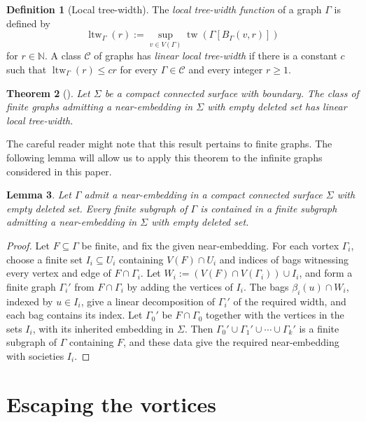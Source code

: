 \documentclass[10pt,a4paper]{amsart}
\newtheorem{theorem}{Theorem}[section]%
\newtheorem{lemma}[theorem]{Lemma}
\theoremstyle{definition}
\newtheorem{definition}[theorem]{Definition}
\begin{document}
\begin{definition}[Local tree-width]\label{def:local-tree-width}
The \emph{local tree-width function} of a graph $\Gamma$ is defined by 
$$
\operatorname{ltw}_\Gamma(r):=\sup_{v\in V(\Gamma)}\operatorname{tw}(\Gamma[B_\Gamma(v,r)])
$$
for $r\in\mathbb{N}$.
A class $\mathcal{C}$ of graphs has \emph{linear local tree-width} if there is a constant $c$ such that $\operatorname{ltw}_\Gamma(r)\leq cr$ for every $\Gamma\in\mathcal{C}$ and every integer $r\geq1$.
\end{definition}

\begin{theorem}[{\cite[Prop.~3.8]{Grohe03}}]\label{thm:grohe-local-tree-width}
Let $\Sigma$ be a compact connected surface with boundary.
The class of finite graphs admitting a near-embedding in $\Sigma$ with empty deleted set has linear local tree-width.
\end{theorem}

The careful reader might note that this result pertains to finite graphs.
The following lemma will allow us to apply this theorem to the infinite graphs considered in this paper.

\begin{lemma}\label{lem:finite-near-embedded-subgraph}
Let $\Gamma$ admit a near-embedding in a compact connected surface $\Sigma$ with empty deleted set.
Every finite subgraph of $\Gamma$ is contained in a finite subgraph admitting a near-embedding in $\Sigma$ with empty deleted set.
\end{lemma}

\begin{proof}
Let $F\subseteq\Gamma$ be finite, and fix the given near-embedding.
For each vortex $\Gamma_i$, choose a finite set $I_i\subseteq U_i$ containing $V(F)\cap U_i$ and indices of bags witnessing every vertex and edge of $F\cap\Gamma_i$.
Let $W_i:=(V(F)\cap V(\Gamma_i))\cup I_i$, and form a finite graph $\Gamma_i'$ from $F\cap\Gamma_i$ by adding the vertices of $I_i$.
The bags $\beta_i(u)\cap W_i$, indexed by $u\in I_i$, give a linear decomposition of $\Gamma_i'$ of the required width, and each bag contains its index.
Let $\Gamma_0'$ be $F\cap\Gamma_0$ together with the vertices in the sets $I_i$, with its inherited embedding in $\Sigma$.
Then $\Gamma_0'\cup\Gamma_1'\cup\cdots\cup\Gamma_k'$ is a finite subgraph of $\Gamma$ containing $F$, and these data give the required near-embedding with societies $I_i$.
\end{proof}

\section{Escaping the vortices}\label{sec:escaping-vortex}
\end{document}
